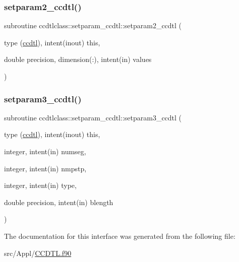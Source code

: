 \mbox{\label{interfaceccdtlclass_1_1setparam__ccdtl_a513ec7eca6a1159d6363d806496dd083}} 
\subsubsection{\texorpdfstring{setparam2\_ccdtl()}{setparam2\_ccdtl()}}
{\footnotesize\ttfamily subroutine ccdtlclass\+::setparam\+\_\+ccdtl\+::setparam2\+\_\+ccdtl (\begin{DoxyParamCaption}\item[{type (\mbox{\hyperlink{namespaceccdtlclass_structccdtlclass_1_1ccdtl}{ccdtl}}), intent(inout)}]{this,  }\item[{double precision, dimension(\+:), intent(in)}]{values }\end{DoxyParamCaption})}

\mbox{\label{interfaceccdtlclass_1_1setparam__ccdtl_a8931b36eaa0fbc593beaf7e6556f61e4}} 
\subsubsection{\texorpdfstring{setparam3\_ccdtl()}{setparam3\_ccdtl()}}
{\footnotesize\ttfamily subroutine ccdtlclass\+::setparam\+\_\+ccdtl\+::setparam3\+\_\+ccdtl (\begin{DoxyParamCaption}\item[{type (\mbox{\hyperlink{namespaceccdtlclass_structccdtlclass_1_1ccdtl}{ccdtl}}), intent(inout)}]{this,  }\item[{integer, intent(in)}]{numseg,  }\item[{integer, intent(in)}]{nmpstp,  }\item[{integer, intent(in)}]{type,  }\item[{double precision, intent(in)}]{blength }\end{DoxyParamCaption})}



The documentation for this interface was generated from the following file\+:\begin{DoxyCompactItemize}
\item 
src/\+Appl/\mbox{\hyperlink{_c_c_d_t_l_8f90}{C\+C\+D\+T\+L.\+f90}}\end{DoxyCompactItemize}
